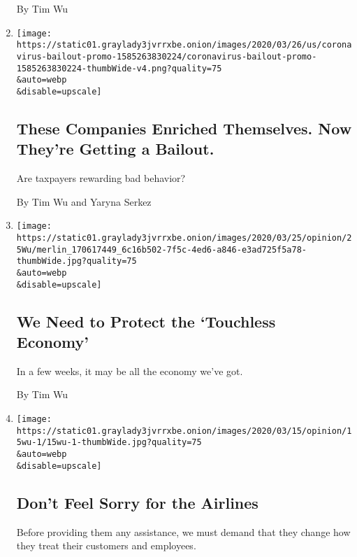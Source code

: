 \begin{enumerate}
  By Tim Wu
\item
  \href{/interactive/2020/03/27/opinion/coronavirus-bailout.html}{}

  \texttt{[image: https://static01.graylady3jvrrxbe.onion/images/2020/03/26/us/coronavirus-bailout-promo-1585263830224/coronavirus-bailout-promo-1585263830224-thumbWide-v4.png?quality=75\\\&auto=webp\\\&disable=upscale]}

  \hypertarget{these-companies-enriched-themselves-now-theyre-getting-a-bailout}{%
  \subsection{These Companies Enriched Themselves. Now They're Getting a
  Bailout.}\label{these-companies-enriched-themselves-now-theyre-getting-a-bailout}}

  Are taxpayers rewarding bad behavior?

  By Tim Wu and Yaryna Serkez
\item
  \href{/2020/03/25/opinion/coronavirus-economy-delivery.html}{}

  \texttt{[image: https://static01.graylady3jvrrxbe.onion/images/2020/03/25/opinion/25Wu/merlin\_170617449\_6c16b502-7f5c-4ed6-a846-e3ad725f5a78-thumbWide.jpg?quality=75\\\&auto=webp\\\&disable=upscale]}

  \hypertarget{we-need-to-protect-the-touchless-economy}{%
  \subsection{We Need to Protect the `Touchless
  Economy'}\label{we-need-to-protect-the-touchless-economy}}

  In a few weeks, it may be all the economy we've got.

  By Tim Wu
\item
  \href{/2020/03/16/opinion/airlines-bailout.html}{}

  \texttt{[image: https://static01.graylady3jvrrxbe.onion/images/2020/03/15/opinion/15wu-1/15wu-1-thumbWide.jpg?quality=75\\\&auto=webp\\\&disable=upscale]}

  \hypertarget{dont-feel-sorry-for-the-airlines}{%
  \subsection{Don't Feel Sorry for the
  Airlines}\label{dont-feel-sorry-for-the-airlines}}

  Before providing them any assistance, we must demand that they change
  how they treat their customers and employees.


\end{enumerate}
